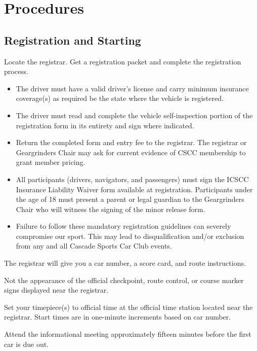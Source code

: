 \section{Procedures}

\subsection{Registration and Starting}
Locate the registrar. Get a registration packet and complete the registration process.

\begin{itemize}

\item The driver must have a valid driver's license and carry minimum insurance coverage(s) as required be the state where the vehicle is registered.

\item The driver must read and complete the vehicle self-inspection portion of the registration form in its entirety and sign where indicated.

\item Return the completed form and entry fee to the registrar. The registrar or Geargrinders Chair may ask for current evidence of CSCC membership to grant member pricing.

\item All participants (drivers, navigators, and passengers) must sign the ICSCC Insurance Liability Waiver form available at registration. Participants under the age of 18 must present a parent or legal guardian to the Geargrinders Chair who will witness the signing of the minor release form.

\item Failure to follow these mandatory registration guidelines can severely compromise our sport. This may lead to disqualification and/or exclusion from any and all Cascade Sports Car Club events.

\end{itemize}

The registrar will give you a car number, a score card, and route instructions.

Not the appearance of the official checkpoint, route control, or course marker signs displayed near the registrar.

Set your timepiece(s) to official time at the official time station located near the registrar. Start times are in one-minute increments based on car number.

Attend the informational meeting approximately fifteen minutes before the first car is due out.

